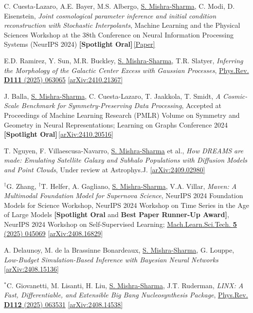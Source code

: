 \documentclass[letterpaper,11pt]{article}
\newenvironment{packed_enumerate}[1][]{
\begin{etaremune}[#1]
  \setlength{\itemsep}{4.0pt}
  \setlength{\parskip}{0pt}
  \setlength{\parsep}{0pt}}{\end{etaremune}
}
\begin{document}
\begin{packed_enumerate}[start=56]
\item C. Cuesta-Lazaro, A.E. Bayer, M.S. Albergo, \underline{S. Mishra-Sharma}, C. Modi, D. Eisenstein, \emph{Joint cosmological parameter inference and initial condition reconstruction with Stochastic Interpolants}, Machine Learning and the Physical Sciences Workshop at the 38th Conference on Neural Information Processing Systems (NeurIPS 2024)  {\textbf{[Spotlight Oral]}}\,\href{https://ml4physicalsciences.github.io/2024/files/NeurIPS_ML4PS_2024_162.pdf}{[Paper]}
  
\item E.D. Ramirez, Y. Sun, M.R. Buckley, \underline{S. Mishra-Sharma}, T.R. Slatyer, \emph{Inferring the Morphology of the Galactic Center Excess with Gaussian Processes}, \href{https://journals.aps.org/prd/abstract/10.1103/PhysRevD.111.063065}{Phys.Rev. \textbf{D111} (2025) 063065} \href{https://arxiv.org/abs/2410.21367}{[arXiv:2410.21367]}
\item J. Balla, \underline{S. Mishra-Sharma}, C. Cuesta-Lazaro, T. Jaakkola, T. Smidt, \emph{A Cosmic-Scale Benchmark for Symmetry-Preserving Data Processing}, Accepted at Proceedings of Machine Learning Research (PMLR) Volume on Symmetry and Geometry in Neural Representations; Learning on Graphs Conference 2024  {\textbf{[Spotlight Oral]}}\,\href{https://arxiv.org/abs/2410.20516}{[arXiv:2410.20516]}
\item T. Nguyen, F. Villaescusa-Navarro, \underline{S. Mishra-Sharma} et al., \emph{How DREAMS are made: Emulating Satellite Galaxy and Subhalo Populations with Diffusion Models and Point Clouds}, Under review at Astrophys.J. \href{https://arxiv.org/abs/2409.02980}{[arXiv:2409.02980]}
\item $^{\dagger}$G. Zhang, $^{\dagger}$T. Helfer, A. Gagliano, \underline{S. Mishra-Sharma}, V.A. Villar, \emph{Maven: A Multimodal Foundation Model for Supernova Science}, NeurIPS 2024 Foundation Models for Science Workshop, NeurIPS 2024 Workshop on Time Series in the Age of Large Models {\textbf{[Spotlight Oral} and \textbf{Best Paper Runner-Up Award]}}, NeurIPS 2024 Workshop on Self-Supervised Learning; \href{https://iopscience.iop.org/article/10.1088/2632-2153/ad990d}{Mach.Learn.Sci.Tech. \textbf{5} (2025) 045069} \href{https://arxiv.org/abs/2408.16829}{[arXiv:2408.16829]}
\item A. Delaunoy, M. de la Brassinne Bonardeaux, \underline{S. Mishra-Sharma}, G. Louppe, \emph{Low-Budget Simulation-Based Inference with Bayesian Neural Networks} \href{https://arxiv.org/abs/2408.15136}{[arXiv:2408.15136]}
\item $^*$C. Giovanetti, M. Lisanti, H. Liu, \underline{S. Mishra-Sharma}, J.T. Ruderman,
\emph{LINX: A Fast, Differentiable, and Extensible Big Bang Nucleosynthesis Package},
\href{https://journals.aps.org/prd/abstract/10.1103/f3tj-r882}{Phys.Rev. \textbf{D112} (2025) 063531}
\href{https://arxiv.org/abs/2408.14538}{[arXiv:2408.14538]}


\end{packed_enumerate}
\end{document}
